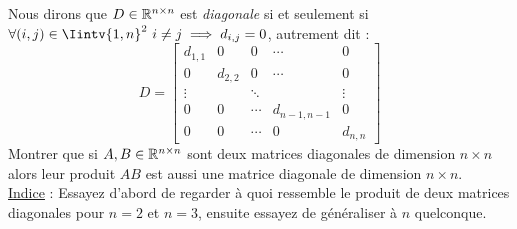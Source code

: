 \begin{exercice}
\label{exoProduitMatricesDiag}

\noindent Nous dirons que $D \in \mathbb{R}^{n \times n}$ est \textit{diagonale} si et seulement si $\forall (i,j) \in \Iintv{1,n}^2 \ i \neq j \implies d_{i,j} = 0$, autrement dit :
$$
D = \begin{bmatrix}
d_{1,1} & 0 & 0 & \cdots & 0\\
0 & d_{2,2} & 0 & \cdots & 0 \\
\vdots & &\ddots & & \vdots \\
0 & 0 & \cdots & d_{n-1, n-1} & 0\\
0 & 0 &\cdots& 0 & d_{n,n}
\end{bmatrix}
$$ 
\noindent Montrer que si $A,B \in \mathbb{R}^{n \times n}$ sont deux matrices diagonales de dimension $n\times n$ alors leur produit $AB$ est aussi une matrice diagonale de dimension $n\times n$. \\

\noindent \underline{Indice} : Essayez d'abord de regarder à quoi ressemble le produit de deux matrices diagonales pour $n=2$ et $n=3$, ensuite essayez de généraliser à $n$ quelconque. \\
\end{exercice}

